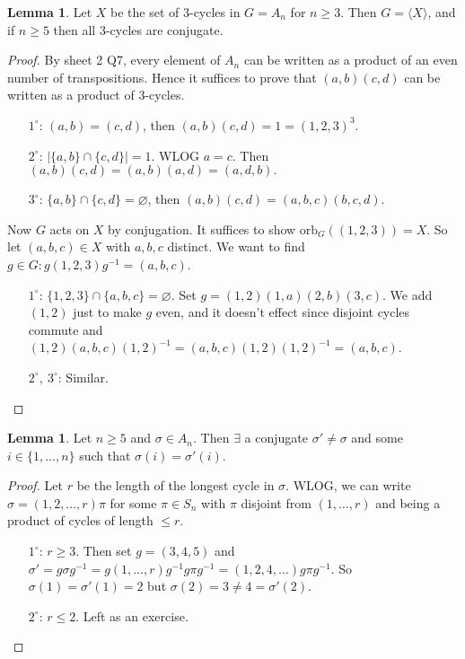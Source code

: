 \documentclass[a4paper]{article}
\newcommand{\orb}{\text{orb}}
\theoremstyle{definition}
\newtheorem{lemma}[defn]{Lemma}
\begin{document}
\begin{lemma}
Let $X$ be the set of 3-cycles in $G=A_n$ for $n\geq 3$. Then $G=\langle X\rangle$, and if $n\geq 5$ then all 3-cycles are conjugate.
\end{lemma}
\begin{proof}
By sheet 2 Q7, every element of $A_n$ can be written as a product of an even number of transpositions. Hence it suffices to prove that $(a,b)(c,d)$ can be written as a product of 3-cycles.
\begin{enumerate}
\item[$1^\circ$:] $(a,b)=(c,d)$, then $(a,b)(c,d)=1=(1,2,3)^3$.
\item[$2^\circ$:] $|\{a,b\}\cap \{c,d\}|=1$. WLOG $a=c$. Then $(a,b)(c,d)=(a,b)(a,d)=(a,d,b).$
\item[$3^\circ$:] $\{a,b\}\cap \{c,d\}=\varnothing$, then $(a,b)(c,d)=(a,b,c)(b,c,d).$
\end{enumerate}

Now $G$ acts on $X$ by conjugation. It suffices to show $\orb_G((1,2,3))=X$. So let $(a,b,c)\in X$ with $a,b,c$ distinct. We want to find $g\in G:g(1,2,3)g^{-1}=(a,b,c)$.
\begin{enumerate}
\item[$1^\circ$:] $\{1,2,3\}\cap \{a,b,c\}=\varnothing$. Set $g=(1,2)(1,a)(2,b)(3,c)$. We add $(1,2)$ just to make $g$ even, and it doesn't effect since disjoint cycles commute and $(1,2)(a,b,c)(1,2)^{-1}=(a,b,c)(1,2)(1,2)^{-1}=(a,b,c)$.
\item[$2^\circ,\ 3^\circ$:] Similar.
\end{enumerate}
\end{proof}

\begin{lemma}
Let $n\geq 5$ and $\sigma\in A_n$. Then $\exists$ a conjugate $\sigma'\neq\sigma$ and some $i\in\{1,\ldots,n\}$ such that $\sigma(i)=\sigma'(i)$.
\end{lemma}
\begin{proof}
Let $r$ be the length of the longest cycle in $\sigma$. WLOG, we can write $\sigma=(1,2,\ldots,r)\pi$ for some $\pi\in S_n$ with $\pi$ disjoint from $(1,\ldots,r)$ and being a product of cycles of length $\leq r$.
\begin{enumerate}
\item[$1^\circ$:] $r\geq 3$. Then set $g=(3,4,5)$ and $\sigma'=g\sigma g^{-1}=g(1,\ldots,r)g^{-1}g\pi g^{-1}=(1,2,4,\ldots)g\pi g^{-1}$. So $\sigma(1)=\sigma'(1)=2$ but $\sigma(2)=3\neq 4=\sigma'(2)$.
\item[$2^\circ$:] $r\leq 2$. Left as an exercise.
\end{enumerate}
\end{proof}
\end{document}
